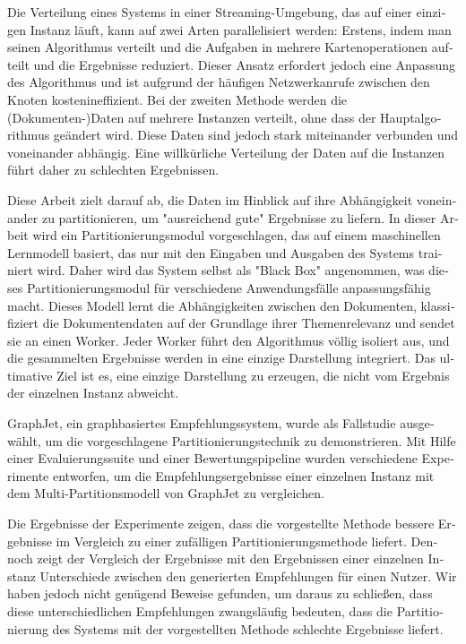 \null\vfil
\begin{otherlanguage}{ngerman}
\begin{center}\textsf{\textbf{\abstractname}}\end{center}

\noindent 
Die Verteilung eines Systems in einer Streaming-Umgebung, das auf einer einzigen Instanz läuft, kann auf zwei Arten parallelisiert werden: Erstens, indem man seinen Algorithmus verteilt und die Aufgaben in mehrere Kartenoperationen aufteilt und die Ergebnisse reduziert. Dieser Ansatz erfordert jedoch eine Anpassung des Algorithmus und ist aufgrund der häufigen Netzwerkanrufe zwischen den Knoten kostenineffizient. Bei der zweiten Methode werden die (Dokumenten-)Daten auf mehrere Instanzen verteilt, ohne dass der Hauptalgorithmus geändert wird. Diese Daten sind jedoch stark miteinander verbunden und voneinander abhängig. Eine willkürliche Verteilung der Daten auf die Instanzen führt daher zu schlechten Ergebnissen.

Diese Arbeit zielt darauf ab, die Daten im Hinblick auf ihre Abhängigkeit voneinander zu partitionieren, um "ausreichend gute" Ergebnisse zu liefern. In dieser Arbeit wird ein Partitionierungsmodul vorgeschlagen, das auf einem maschinellen Lernmodell basiert, das nur mit den Eingaben und Ausgaben des Systems trainiert wird. Daher wird das System selbst als "Black Box" angenommen, was dieses Partitionierungsmodul für verschiedene Anwendungsfälle anpassungsfähig macht. Dieses Modell lernt die Abhängigkeiten zwischen den Dokumenten, klassifiziert die Dokumentendaten auf der Grundlage ihrer Themenrelevanz und sendet sie an einen Worker. Jeder Worker führt den Algorithmus völlig isoliert aus, und die gesammelten Ergebnisse werden in eine einzige Darstellung integriert. Das ultimative Ziel ist es, eine einzige Darstellung zu erzeugen, die nicht vom Ergebnis der einzelnen Instanz abweicht.

GraphJet, ein graphbasiertes Empfehlungssystem, wurde als Fallstudie ausgewählt, um die vorgeschlagene Partitionierungstechnik zu demonstrieren. Mit Hilfe einer Evaluierungssuite und einer Bewertungspipeline wurden verschiedene Experimente entworfen, um die Empfehlungsergebnisse einer einzelnen Instanz mit dem Multi-Partitionsmodell von GraphJet zu vergleichen.


Die Ergebnisse der Experimente zeigen, dass die vorgestellte Methode bessere Ergebnisse im Vergleich zu einer zufälligen Partitionierungsmethode liefert. Dennoch zeigt der Vergleich der Ergebnisse mit den Ergebnissen einer einzelnen Instanz Unterschiede zwischen den generierten Empfehlungen für einen Nutzer. Wir haben jedoch nicht genügend Beweise gefunden, um daraus zu schließen, dass diese unterschiedlichen Empfehlungen zwangsläufig bedeuten, dass die Partitionierung des Systems mit der vorgestellten Methode schlechte Ergebnisse liefert.

\end{otherlanguage}
\vfil\null



